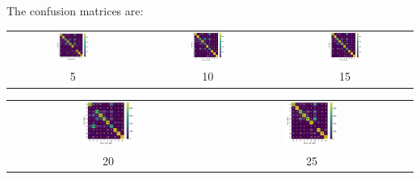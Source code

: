 \documentclass[12pt]{article}
\begin{document}
\begin{enumerate}[label=(\alph*)]
    The confusion matrices are:
    \begin{center}
        \begin{tabular}{c c c}
            \includegraphics[width=0.27\textwidth]{../Q2/single_layer_sigmoid/cmat_5.pdf} &
            \includegraphics[width=0.27\textwidth]{../Q2/single_layer_sigmoid/cmat_10.pdf} &
            \includegraphics[width=0.27\textwidth]{../Q2/single_layer_sigmoid/cmat_15.pdf} \\
            5 & 10 & 15 
        \end{tabular}

        \begin{tabular}{c c}
            \includegraphics[width=0.27\textwidth]{../Q2/single_layer_sigmoid/cmat_20.pdf} &
            \includegraphics[width=0.27\textwidth]{../Q2/single_layer_sigmoid/cmat_25.pdf} \\
            20 & 25
        \end{tabular}
    \end{center}


\end{enumerate}
\end{document}
